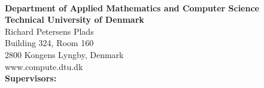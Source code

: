 \thispagestyle{empty} %
\frieze
\vspace*{\fill}
\noindent
\sffamily
\small
\\

\noindent\textbf{Department of Applied Mathematics and Computer Science}\\
\textbf{Technical University of Denmark}\\
Richard Petersens Plads\\
Building 324, Room 160\\
2800 Kongens Lyngby, Denmark\\
www.compute.dtu.dk\\

\large
\vspace*{\fill}
\hspace{-0.52cm}\textbf{Supervisors:} %
\vspace{5cm}

\small





\normalsize
\normalfont
\vspace*{2.5cm}
